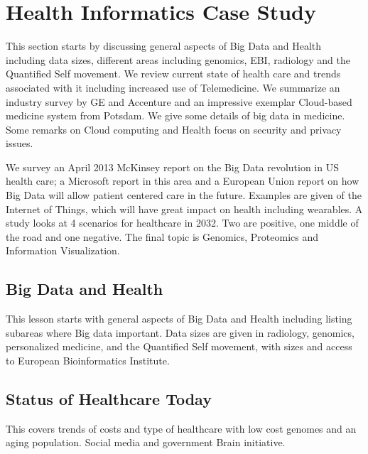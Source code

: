 

\chapter{Health Informatics Case Study}

\FILENAME


This section starts by discussing general aspects of Big Data and Health
including data sizes, different areas including genomics, EBI, radiology
and the Quantified Self movement. We review current state of health care
and trends associated with it including increased use of Telemedicine.
We summarize an industry survey by GE and Accenture and an impressive
exemplar Cloud-based medicine system from Potsdam. We give some details
of big data in medicine. Some remarks on Cloud computing and Health
focus on security and privacy issues.

We survey an April 2013 McKinsey report on the Big Data revolution in US
health care; a Microsoft report in this area and a European Union report
on how Big Data will allow patient centered care in the future. Examples
are given of the Internet of Things, which will have great impact on
health including wearables. A study looks at 4 scenarios for healthcare
in 2032. Two are positive, one middle of the road and one negative. The
final topic is Genomics, Proteomics and Information Visualization.

\section{Big Data and Health}\label{big-data-and-health}

This lesson starts with general aspects of Big Data and Health including
listing subareas where Big data important. Data sizes are given in
radiology, genomics, personalized medicine, and the Quantified Self
movement, with sizes and access to European Bioinformatics Institute.


\section{Status of Healthcare Today}

This covers trends of costs and type of healthcare with low cost genomes
and an aging population. Social media and government Brain initiative.

